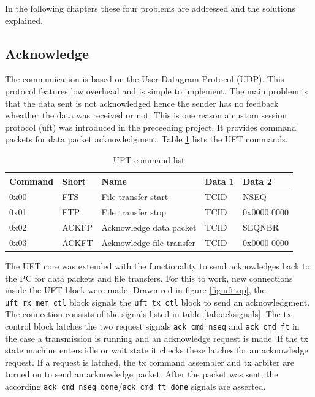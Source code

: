In the following chapters these four problems are addressed and the solutions
explained.

\subsection{Acknowledge}
The communication is based on the User Datagram Protocol (UDP). This protocol
features low overhead and is simple to implement. The main problem is that the
data sent is not acknowledged hence the sender has no feedback wheather the data
was received or not. This is one reason a custom session protocol (\gls{uft})
was introduced in the preceeding project. It provides command packets for data
packet acknowledgment. Table \ref{tab:uftcommandlist} lists the UFT commands.


\begin{table}[t!]
    \centering
    \begin{tabular}{l l l l l}
        \toprule
        Command & Short & Name & Data 1 & Data 2 \\
        \midrule
        0x00 & FTS & 
        File transfer start & TCID & NSEQ
        \\
        0x01 & FTP &
        File transfer stop & TCID & 0x0000 0000
        \\
        0x02 & ACKFP &
        Acknowledge data packet & TCID & SEQNBR
        \\
        0x03 & ACKFT &
        Acknowledge file transfer & TCID & 0x0000 0000
        \\
        \bottomrule
    \end{tabular}
    \caption{UFT command list}
    \label{tab:uftcommandlist}
\end{table}

The UFT core was extended with the functionality to send acknowledges back to
the PC for data packets and file transfers. For this to work, new connections
inside the UFT block were made. Drawn red in figure \ref{fig:ufttop}, the 
\texttt{uft\_rx\_mem\_ctl} block signals the \texttt{uft\_tx\_ctl} block to send
an acknowledgment. The connection consists of the signals listed in table 
\ref{tab:acksignals}. The tx control block latches the two request signals 
\texttt{ack\_cmd\_nseq} and \texttt{ack\_cmd\_ft} in the case a transmission is
running and an acknowledge request is made. If the tx state machine enters idle
or wait state it checks these latches for an acknowledge request. If a request
is latched, the tx command assembler and tx arbiter are turned on to send an
acknowledge packet. After the packet was sent, the according 
\texttt{ack\_cmd\_nseq\_done}/\texttt{ack\_cmd\_ft\_done} signals are asserted.


